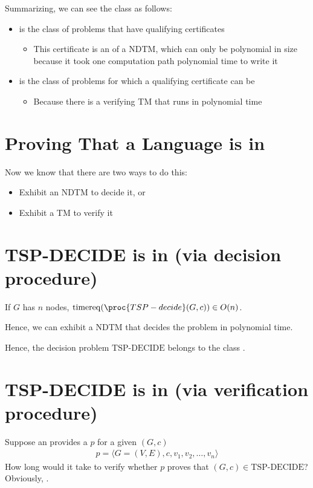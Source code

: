 \documentclass[a4paper]{report}
\theoremstyle{definition}
\DeclareMathOperator*{\treq}{timereq}
\begin{document}
Summarizing, we can see the class \NP{} as follows:
\begin{itemize}
\item \NP{} is the class of problems that have  qualifying certificates
\begin{itemize}
\item This certificate is an  of a NDTM, which can only be polynomial in size because it took one computation path polynomial time to write it
\end{itemize}
\item \NP{} is the class of problems for which a qualifying certificate can be 
\begin{itemize}
\item Because there is a verifying TM that runs in polynomial time
\end{itemize}
\end{itemize}

\section{Proving That a Language is in \NP}
Now we know that there are two ways to do this:
\begin{itemize}
\item Exhibit an NDTM to decide it, or
\item Exhibit a TM to verify it
\end{itemize}

\section{TSP-DECIDE is in \NP{} (via decision procedure)}

If $G$ has $n$ nodes, $\treq(\proc{TSP-decide}(G, c)) \in O(n)$.

Hence, we can exhibit a NDTM that decides the problem in polynomial time.

Hence, the decision problem $\text{TSP-DECIDE}$ belongs to the class \NP.

\section{TSP-DECIDE is in \NP{} (via verification procedure)}

Suppose an  provides a  $p$ for a given $(G, c)$
%
\begin{align*}
p = \langle G = (V,E), c, v_1, v_2, \dots, v_n \rangle
\end{align*}
%
How long would it take to verify whether $p$ proves that $(G, c) \in \text{TSP-DECIDE}$? Obviously, .
\end{document}
